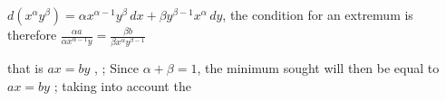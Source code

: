  $d(x^\alpha y^\beta)=\alpha x^{\alpha-1}y^\beta\,dx+\beta y^{\beta-1}x^\alpha\,dy$,
the condition for an extremum is therefore $\frac{\alpha a}{\alpha x^{\alpha-1}y}=\frac{\beta b}{\beta x^\alpha y^{\beta-1}}$

that is $ax=by$ \deleted{\unsure{$=$}},   ;  Since $\alpha+\beta=1$, the minimum sought will then be  equal to $ax=by$ ; taking into account the 
